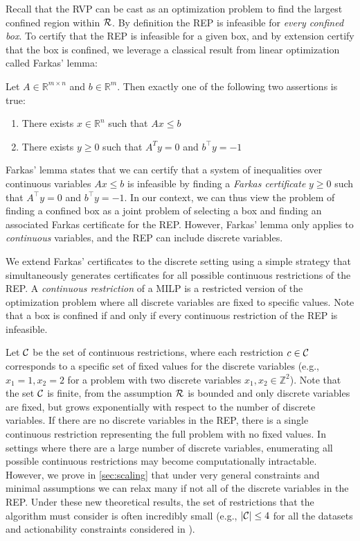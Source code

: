 Recall that the RVP can be cast as an optimization problem to find the largest confined region within ${\cal R}$. By definition the REP is infeasible for \emph{every confined box}. To certify that the REP is infeasible for a given box, and by extension certify that the box is confined, we leverage a classical result from linear optimization called Farkas' lemma: 

\begin{theorem}\normalfont
Let $A \in \mathbb{R}^{m \times n}$ and $b \in \mathbb{R}^m$. Then exactly one of the following two assertions is true:
\begin{enumerate}[label={\Roman*.},leftmargin=*,itemsep=0.1em]
    \item There exists $x \in \mathbb{R}^n$ such that $Ax \leq b$
    \item There exists $y \geq 0$ such that $A^T y = 0$ and $b^\top y = -1$
\end{enumerate}
\end{theorem}

Farkas' lemma states that we can certify that a system of inequalities over continuous variables $Ax \leq b$ is infeasible by finding a \emph{Farkas certificate} $y \geq 0$ such that $A^\top y = 0$ and $b^\top y = -1$. In our context, we can thus view the problem of finding a confined box as a joint problem of selecting a box and finding an associated Farkas certificate for the REP. However, Farkas' lemma only applies to \emph{continuous} variables, and the REP can include discrete variables.

We extend Farkas' certificates to the discrete setting using a simple strategy that simultaneously generates certificates for all possible continuous restrictions of the REP. A \emph{continuous restriction} of a MILP is a restricted version of the optimization problem where all discrete variables are fixed to specific values. Note that a box is confined if and only if every continuous restriction of the REP is infeasible.

Let  ${\cal C}$ be the set of continuous restrictions, where each restriction $c \in {\cal C}$ corresponds to a specific set of fixed values for the discrete variables (e.g., $x_1 = 1, x_2 = 2$ for a problem with two discrete variables $x_1, x_2 \in \mathbb{Z}^2$). Note that the set ${\cal C}$ is finite, from the assumption ${\cal R}$ is bounded and only discrete variables are fixed, but grows exponentially with respect to the number of discrete variables. If there are no discrete variables in the REP, there is a single continuous restriction representing the full problem with no fixed values. In settings where there are a large number of discrete variables, enumerating all possible continuous restrictions may become computationally intractable. However, we prove in \cref{sec:scaling} that under very general constraints and minimal assumptions we can relax many if not all of the discrete variables in the REP. Under these new theoretical results, the set of restrictions that the algorithm must consider is often incredibly small (e.g., $|{\cal C}| \leq 4$ for all the datasets and actionability constraints considered in \citet{kothari2023prediction}). 

